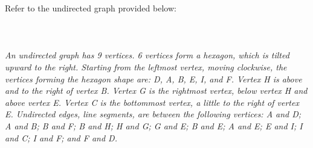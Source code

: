 \documentclass{amsart}
\theoremstyle{definition}
\theoremstyle{Exercise}
\theoremstyle{remark}
\theoremstyle{rule}
\numberwithin{equation}{section}
\begin{document}
Refer to the undirected graph provided below:
\\\\
  \\\\
{\color{blue}{\bf Figure 6:} \emph{An undirected graph has 9 vertices. 6 vertices form a hexagon, which is tilted upward to the right. Starting from the leftmost vertex, moving clockwise, the vertices forming the hexagon shape are: D, A, B, E, I, and F. Vertex H is above and to the right of vertex B. Vertex G is the rightmost vertex, below vertex H and above vertex E. Vertex C is the bottommost vertex, a little to the right of vertex E. Undirected edges, line segments, are between the following vertices: A and D; A and B; B and F; B and H; H and G; G and E; B and E; A and E; E and I; I and C; I and F; and F and D.
}
}
\\
\\
\end{document}
